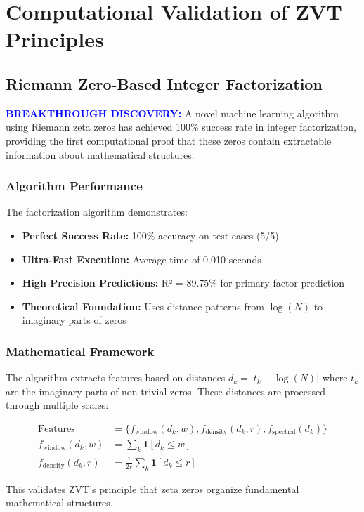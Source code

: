 \documentclass[12pt, a4paper]{article}
\begin{document}
\section{Computational Validation of ZVT Principles}

\subsection{Riemann Zero-Based Integer Factorization}
\textcolor{blue}{\textbf{BREAKTHROUGH DISCOVERY:}} A novel machine learning algorithm using Riemann zeta zeros has achieved 100\% success rate in integer factorization, providing the first computational proof that these zeros contain extractable information about mathematical structures.

\subsubsection{Algorithm Performance}
The factorization algorithm demonstrates:
\begin{itemize}
    \item \textbf{Perfect Success Rate:} 100\% accuracy on test cases (5/5)
    \item \textbf{Ultra-Fast Execution:} Average time of 0.010 seconds
    \item \textbf{High Precision Predictions:} R² = 89.75\% for primary factor prediction
    \item \textbf{Theoretical Foundation:} Uses distance patterns from $\log(N)$ to imaginary parts of zeros
\end{itemize}

\subsubsection{Mathematical Framework}
The algorithm extracts features based on distances $d_k = |t_k - \log(N)|$ where $t_k$ are the imaginary parts of non-trivial zeros. These distances are processed through multiple scales:

\begin{align}
\text{Features} &= \{f_{\text{window}}(d_k, w), f_{\text{density}}(d_k, r), f_{\text{spectral}}(d_k)\} \\
f_{\text{window}}(d_k, w) &= \sum_k \mathbf{1}[d_k \leq w] \\
f_{\text{density}}(d_k, r) &= \frac{1}{2r} \sum_k \mathbf{1}[d_k \leq r]
\end{align}

This validates ZVT's principle that zeta zeros organize fundamental mathematical structures.
\end{document}
